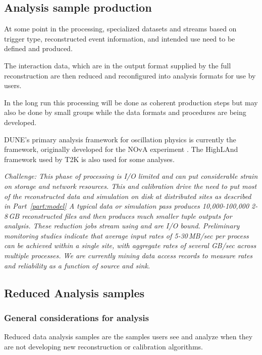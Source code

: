 \documentclass[../main-v1.tex]{subfiles}
\begin{document}
\subsection{Analysis sample production}
At some point in the processing, specialized datasets and streams based on trigger type, reconstructed event information, and intended use need to  be defined and produced.

The interaction data, which are in the output format supplied by the full reconstruction are then reduced and reconfigured into analysis formats for use by users. 

In the long run this processing will be done as coherent production steps but may also be done by small groups while the data formats and procedures are being developed.

DUNE's primary analysis framework for oscillation physics is currently the  framework, originally developed for the NOvA experiment \cite{Backhouse:2015wlj,  bib:cafana}. The HighLAnd framework used by T2K is also used for some analyses. 





{\it Challenge:  This phase of processing is I/O limited and can put considerable strain on storage and network resources.  This and calibration drive the need to put most of the reconstructed data and simulation on disk at distributed sites as described in Part~\ref{part:model}
A typical  data or simulation pass produces  10,000-100,000 2-8\,GB reconstructed files and  then produces much smaller tuple outputs for analysis.  These reduction jobs stream using  and are I/O bound. Preliminary monitoring studies indicate that average input rates of 5-30\,MB/sec per process can be achieved within a single site, with aggregate rates of several GB/sec across multiple processes. We are currently mining data access records to measure rates and reliability as a function of source and sink. }



\subsection{Reduced Analysis samples}

\subsubsection{General considerations for analysis}
Reduced data analysis samples  are the samples users see and analyze when they are not developing new reconstruction  or calibration algorithms. 
\end{document}
